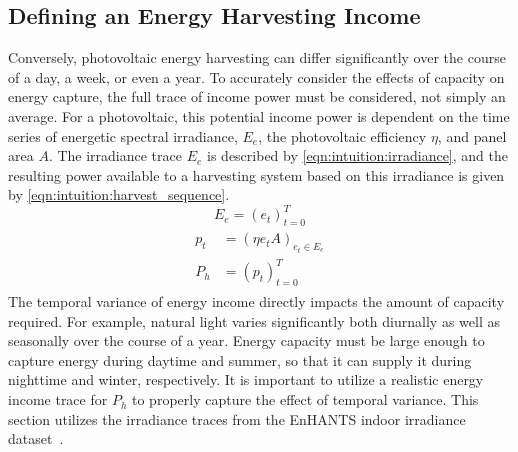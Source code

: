 
\subsection{Defining an Energy Harvesting Income}
Conversely, photovoltaic energy harvesting can differ significantly over the course of a day, a week, or even a year. 
To accurately consider the effects of capacity on energy capture, the full trace of income power must be considered, not simply an average.
For a photovoltaic, this potential income power is dependent on the time series of energetic spectral irradiance, $E_e$, the photovoltaic efficiency $\eta$, and panel area $A$.
The irradiance trace $E_e$ is described by \cref{eqn:intuition:irradiance}, and the resulting power available to a harvesting system based on this irradiance is given by \cref{eqn:intuition:harvest_sequence}.
\begin{equation}
    \label{eqn:intuition:irradiance}
    E_e = (e_t) ^ {T}_{t=0}
\end{equation}
\begin{align} 
    \begin{split}
    p_t & = (\eta e_{t} A)_{e_t \in E_e}\\
    P_{h} &= (p_t) ^T _{t=0}
    \end{split}
    \label{eqn:intuition:harvest_sequence}
\end{align}
The temporal variance of energy income directly impacts the amount of capacity required. 
For example, natural light varies significantly both diurnally as well as seasonally over the course of a year.
Energy capacity must be large enough to capture energy during daytime and summer, so that it can supply it during nighttime and winter, respectively. 
It is important to utilize a realistic energy income trace for $P_h$ to properly capture the effect of temporal variance.
This section utilizes the irradiance traces from the EnHANTS indoor irradiance dataset~\cite{gorlatova2013networking}.
